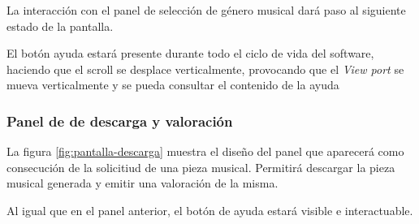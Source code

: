 La interacción con el panel de selección de género musical dará paso al siguiente estado de la pantalla.

El botón ayuda estará presente durante todo el ciclo de vida del software, haciendo que el scroll se desplace verticalmente, provocando que el \emph{View port} se mueva verticalmente y se pueda consultar el contenido de la ayuda
 
\subsubsection{Panel de de descarga y valoración}

La figura \ref{fig:pantalla-descarga} muestra el diseño del panel que aparecerá como consecución de la solicitiud de una pieza musical. Permitirá descargar la pieza musical generada y emitir una valoración de la misma.


Al igual que en el panel anterior, el botón de ayuda estará visible e interactuable.

